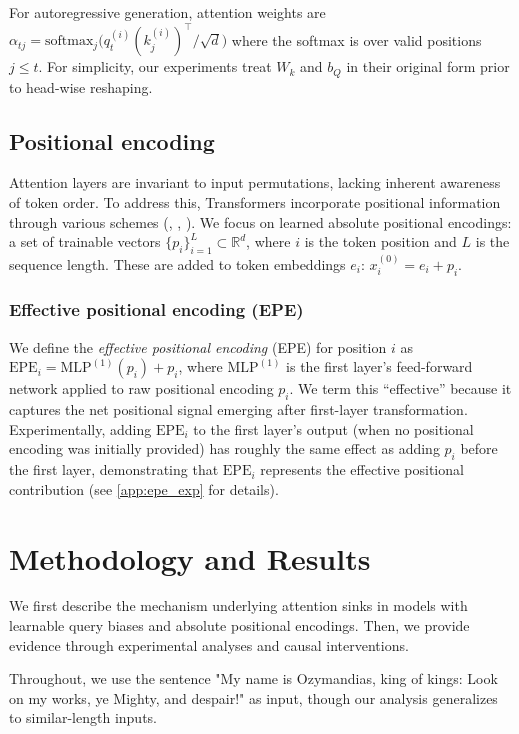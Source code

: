 \documentclass[11pt]{article}
\begin{document}
For autoregressive generation, attention weights are $\alpha_{t j}=\mathrm{softmax}_j\!\big(q_t^{(i)} (k_j^{(i)})^\top / \sqrt{d}\big)$ where the softmax is over valid positions $j \le t$. For simplicity, our experiments treat $W_k$ and $b_Q$ in their original form prior to head-wise reshaping.

\subsection{Positional encoding}
Attention layers are invariant to input permutations, lacking inherent awareness of token order. To address this, Transformers incorporate positional information through various schemes (\citet{su2021roformer}, \citet{press2021train}, \citet{Irie2019LanguageMW}). We focus on learned absolute positional encodings: a set of trainable vectors $\{p_i\}_{i=1}^{L} \subset \mathbb{R}^{d}$, where $i$ is the token position and $L$ is the sequence length. These are added to token embeddings $e_i$: $x_i^{(0)} = e_i + p_i$.

\subsubsection{Effective positional encoding (EPE)}
We define the \emph{effective positional encoding} (EPE) for position $i$ as $\mathrm{EPE}_i = \mathrm{MLP}^{(1)}(p_i) + p_i$, where $\mathrm{MLP}^{(1)}$ is the first layer's feed-forward network applied to raw positional encoding $p_i$. We term this ``effective'' because it captures the net positional signal emerging after first-layer transformation. Experimentally, adding $\mathrm{EPE}_i$ to the first layer's output (when no positional encoding was initially provided) has roughly the same effect as adding $p_i$ before the first layer, demonstrating that $\mathrm{EPE}_i$ represents the effective positional contribution (see \cref{app:epe_exp} for details).

\section{Methodology and Results}
We first describe the mechanism underlying attention sinks in models with learnable query biases and absolute positional encodings. Then, we provide evidence through experimental analyses and causal interventions.

Throughout, we use the sentence "My name is Ozymandias, king of kings: Look on my works, ye Mighty, and despair!" as input, though our analysis generalizes to similar-length inputs.
\end{document}
